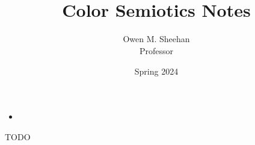 \documentclass[12pt]{article}
\title{\class{}\\Color Semiotics Notes}
\author{Owen M. Sheehan\\Professor \prof{}}
\date{Spring 2024}
\begin{document}
\maketitle
    \begin{itemize}
        \item 
    \end{itemize}

TODO %
\end{document}
